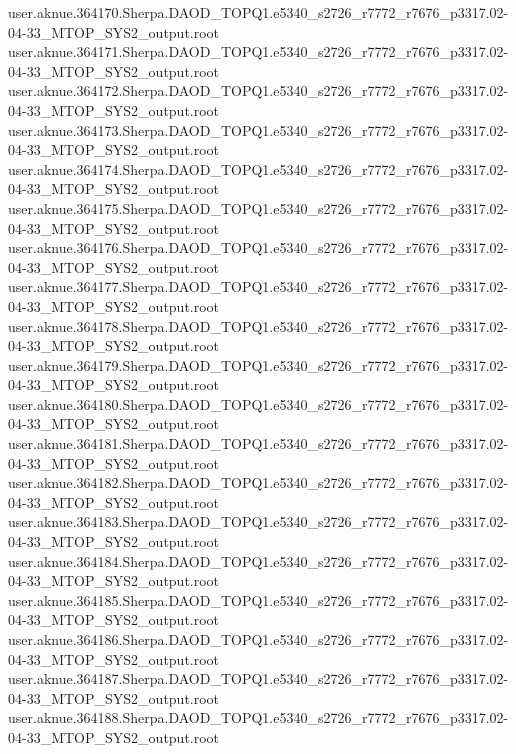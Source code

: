 {user.aknue.364170.Sherpa.DAOD_TOPQ1.e5340_s2726_r7772_r7676_p3317.02-04-33_MTOP_SYS2_output.root\\
user.aknue.364171.Sherpa.DAOD_TOPQ1.e5340_s2726_r7772_r7676_p3317.02-04-33_MTOP_SYS2_output.root\\
user.aknue.364172.Sherpa.DAOD_TOPQ1.e5340_s2726_r7772_r7676_p3317.02-04-33_MTOP_SYS2_output.root\\
user.aknue.364173.Sherpa.DAOD_TOPQ1.e5340_s2726_r7772_r7676_p3317.02-04-33_MTOP_SYS2_output.root\\
user.aknue.364174.Sherpa.DAOD_TOPQ1.e5340_s2726_r7772_r7676_p3317.02-04-33_MTOP_SYS2_output.root\\
user.aknue.364175.Sherpa.DAOD_TOPQ1.e5340_s2726_r7772_r7676_p3317.02-04-33_MTOP_SYS2_output.root\\
user.aknue.364176.Sherpa.DAOD_TOPQ1.e5340_s2726_r7772_r7676_p3317.02-04-33_MTOP_SYS2_output.root\\
user.aknue.364177.Sherpa.DAOD_TOPQ1.e5340_s2726_r7772_r7676_p3317.02-04-33_MTOP_SYS2_output.root\\
user.aknue.364178.Sherpa.DAOD_TOPQ1.e5340_s2726_r7772_r7676_p3317.02-04-33_MTOP_SYS2_output.root\\
user.aknue.364179.Sherpa.DAOD_TOPQ1.e5340_s2726_r7772_r7676_p3317.02-04-33_MTOP_SYS2_output.root\\
user.aknue.364180.Sherpa.DAOD_TOPQ1.e5340_s2726_r7772_r7676_p3317.02-04-33_MTOP_SYS2_output.root\\
user.aknue.364181.Sherpa.DAOD_TOPQ1.e5340_s2726_r7772_r7676_p3317.02-04-33_MTOP_SYS2_output.root\\
user.aknue.364182.Sherpa.DAOD_TOPQ1.e5340_s2726_r7772_r7676_p3317.02-04-33_MTOP_SYS2_output.root\\
user.aknue.364183.Sherpa.DAOD_TOPQ1.e5340_s2726_r7772_r7676_p3317.02-04-33_MTOP_SYS2_output.root\\
user.aknue.364184.Sherpa.DAOD_TOPQ1.e5340_s2726_r7772_r7676_p3317.02-04-33_MTOP_SYS2_output.root\\
user.aknue.364185.Sherpa.DAOD_TOPQ1.e5340_s2726_r7772_r7676_p3317.02-04-33_MTOP_SYS2_output.root\\
user.aknue.364186.Sherpa.DAOD_TOPQ1.e5340_s2726_r7772_r7676_p3317.02-04-33_MTOP_SYS2_output.root\\
user.aknue.364187.Sherpa.DAOD_TOPQ1.e5340_s2726_r7772_r7676_p3317.02-04-33_MTOP_SYS2_output.root\\
user.aknue.364188.Sherpa.DAOD_TOPQ1.e5340_s2726_r7772_r7676_p3317.02-04-33_MTOP_SYS2_output.root\\
}
